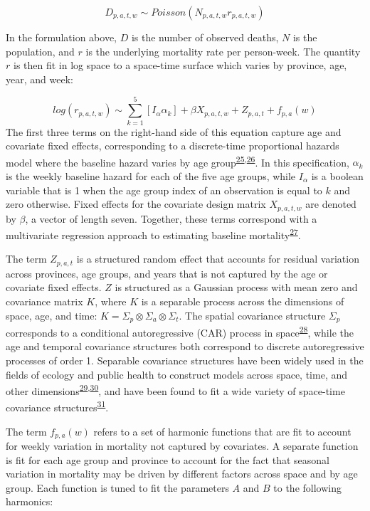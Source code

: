 \documentclass[
]{article}
\begin{document}
\[D_{p,a,t,w} \sim Poisson(N_{p,a,t,w}r_{p,a,t,w})\]

In the formulation above, \(D\) is the number of observed deaths, \(N\) is the population, and \(r\) is the underlying mortality rate per person-week. The quantity \(r\) is then fit in log space to a space-time surface which varies by province, age, year, and week:

\[log(r_{p,a,t,w}) \sim \sum_{k=1}^{5}[I_{\alpha}\alpha_{k}] + \beta X_{p,a,t,w} + Z_{p,a,t} + f_{p,a}(w)\]
The first three terms on the right-hand side of this equation capture age and covariate fixed effects, corresponding to a discrete-time proportional hazards model where the baseline hazard varies by age group\textsuperscript{\protect\hyperlink{ref-Cox1972}{25},\protect\hyperlink{ref-Burstein2019}{26}}⁠. In this specification, \(\alpha_k\) is the weekly baseline hazard for each of the five age groups, while \(I_\alpha\) is a boolean variable that is 1 when the age group index of an observation is equal to \(k\) and zero otherwise. Fixed effects for the covariate design matrix \(X_{p,a,t,w}\) are denoted by \(\beta\), a vector of length seven. Together, these terms correspond with a multivariate regression approach to estimating baseline mortality\textsuperscript{\protect\hyperlink{ref-Ederer1961}{27}}⁠.

The term \(Z_{p,a,t}\) is a structured random effect that accounts for residual variation across provinces, age groups, and years that is not captured by the age or covariate fixed effects. \(Z\) is structured as a Gaussian process with mean zero and covariance matrix \(K\), where \(K\) is a separable process across the dimensions of space, age, and time: \(K = \Sigma_p \otimes \Sigma_a \otimes \Sigma_t\). The spatial covariance structure \(\Sigma_p\) corresponds to a conditional autoregressive (CAR) process in space\textsuperscript{\protect\hyperlink{ref-Riebler2016}{28}}, while the age and temporal covariance structures both correspond to discrete autoregressive processes of order 1. Separable covariance structures have been widely used in the fields of ecology and public health to construct models across space, time, and other dimensions\textsuperscript{\protect\hyperlink{ref-Thorson2017}{29},\protect\hyperlink{ref-Wakefield2019}{30}}⁠, and have been found to fit a wide variety of space-time covariance structures\textsuperscript{\protect\hyperlink{ref-Huang2007}{31}}.

The term \(f_{p,a}(w)\) refers to a set of harmonic functions that are fit to account for weekly variation in mortality not captured by covariates. A separate function is fit for each age group and province to account for the fact that seasonal variation in mortality may be driven by different factors across space and by age group. Each function is tuned to fit the parameters \(A\) and \(B\) to the following harmonics:
\end{document}

